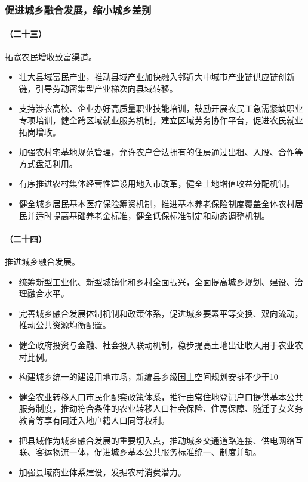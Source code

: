 \subsubsection{促进城乡融合发展，缩小城乡差别}

\paragraph{（二十三）}拓宽农民增收致富渠道。

\begin{itemize}
    \item 壮大县域富民产业，推动县域产业加快融入邻近大中城市产业链供应链创新链，引导劳动密集型产业梯次向县域转移。
    \item 支持涉农高校、企业办好高质量职业技能培训，鼓励开展农民工急需紧缺职业专项培训，健全跨区域就业服务机制，建立区域劳务协作平台，促进农民就业拓岗增收。
    \item 加强农村宅基地规范管理，允许农户合法拥有的住房通过出租、入股、合作等方式盘活利用。
    \item 有序推进农村集体经营性建设用地入市改革，健全土地增值收益分配机制。
    \item 健全城乡居民基本医疗保险筹资机制，推进基本养老保险制度覆盖全体农村居民并适时提高基础养老金标准，健全低保标准制定和动态调整机制。
\end{itemize}

\paragraph{（二十四）}推进城乡融合发展。

\begin{itemize}
    \item 统筹新型工业化、新型城镇化和乡村全面振兴，全面提高城乡规划、建设、治理融合水平。
    \item 完善城乡融合发展体制机制和政策体系，促进城乡要素平等交换、双向流动，推动公共资源均衡配置。
    \item 健全政府投资与金融、社会投入联动机制，稳步提高土地出让收入用于农业农村比例。
    \item 构建城乡统一的建设用地市场，新编县乡级国土空间规划安排不少于10%
    \item 健全农业转移人口市民化配套政策体系，推行由常住地登记户口提供基本公共服务制度，推动符合条件的农业转移人口社会保险、住房保障、随迁子女义务教育等享有同迁入地户籍人口同等权利。
    \item 把县域作为城乡融合发展的重要切入点，推动城乡交通道路连接、供电网络互联、客运物流一体，促进城乡基本公共服务标准统一、制度并轨。
    \item 加强县域商业体系建设，发掘农村消费潜力。
\end{itemize}

